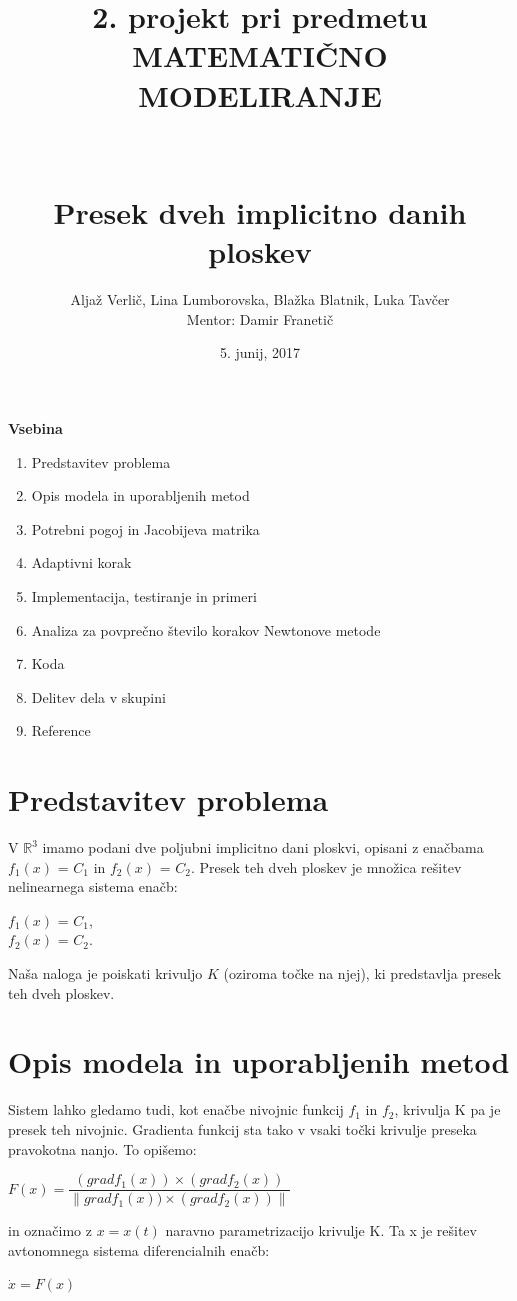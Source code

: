 \documentclass[12pt]{article}
\title{\small{2. projekt pri predmetu MATEMATIČNO MODELIRANJE} \\ \hfill \\ \hfill \\ \huge{\textbf{Presek dveh implicitno danih ploskev}}}
\author{Aljaž Verlič, Lina Lumborovska, Blažka Blatnik, Luka Tavčer \\
	Mentor: Damir Franetič}
\date{5. junij, 2017}
\begin{document}
	
	
	\maketitle
	\newpage
	\textbf{\large{Vsebina}} 
	\begin{enumerate}
		\item Predstavitev problema
		\item Opis modela in uporabljenih metod
		\item Potrebni pogoj in Jacobijeva matrika
		\item Adaptivni korak
		\item Implementacija, testiranje in primeri
		\item Analiza za povprečno število korakov Newtonove metode
		\item Koda
		\item Delitev dela v skupini
		\item Reference
	\end{enumerate} 
	\newpage
	
	\section{Predstavitev problema}
	V $\mathbb{R}^3$ imamo podani dve poljubni implicitno dani ploskvi, opisani z enačbama $f_{1}(x)$ = $C_{1}$ in $f_{2}(x)$ = $C_{2}$. Presek teh dveh ploskev je množica rešitev nelinearnega sistema enačb:
	\begin{center}
		$f_{1}(x)$ = $C_{1}$,\\$f_{2}(x)$ = $C_{2}$.
	\end{center}
	Naša naloga je poiskati krivuljo $K$ (oziroma točke na njej), ki predstavlja presek teh dveh ploskev. \\
	
	\section{Opis modela in uporabljenih metod}
	Sistem lahko gledamo tudi, kot enačbe nivojnic funkcij  $f_{1}$ in $f_{2}$, krivulja K pa je presek teh nivojnic. Gradienta funkcij sta tako v vsaki točki krivulje preseka pravokotna nanjo. To opišemo:
	\begin{center}
		$F(x) = \dfrac{(grad f_{1}(x))\times(grad f_{2}(x))}{\|grad f_{1}(x))\times(grad f_{2}(x))\|}$
	\end{center}
	in označimo z $x = x(t)$ naravno parametrizacijo krivulje K. Ta x je rešitev avtonomnega sistema diferencialnih enačb:
	\begin{center}
		$\dot{x} = F(x)$
	\end{center}
	
\end{document}
